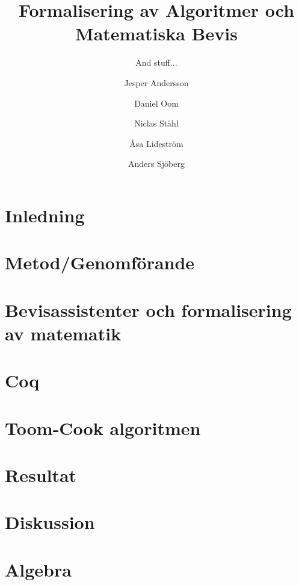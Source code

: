 \documentclass[bachelors,a4paper,gu]{chalmers-thesis}
\title{Formalisering av Algoritmer och Matematiska Bevis}
\subtitle{And stuff...}
\author{Jesper Andersson\and Daniel Oom\and Niclas Ståhl\and Åsa Lideström\and Anders Sjöberg}
\begin{document}
\maketitle

\chapter{Inledning}


\newpage
\chapter{Metod/Genomförande}


\newpage
\chapter{Bevisassistenter och formalisering av matematik}

\chapter{Coq}



\newpage
\chapter{Toom-Cook algoritmen}





\newpage
\chapter{Resultat}




\newpage
\chapter{Diskussion}


\newpage
\nocite{*}
\printbibliography

\appendix
\newpage
\chapter{Algebra}

\end{document}
